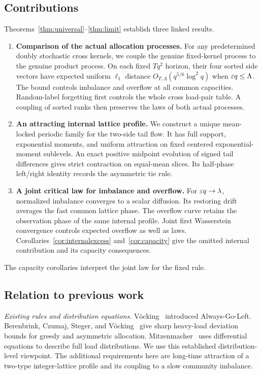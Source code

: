 \subsection{Contributions}
Theorems~\ref{thm:universal}--\ref{thm:limit} establish three linked results.
\begin{enumerate}[label=(\roman*),leftmargin=*]
\item \textbf{Comparison of the actual allocation processes.}
For any predetermined doubly stochastic cross kernels, we couple the genuine
fixed-kernel process to the genuine product process. On each fixed $Tq^2$
horizon, their four sorted side vectors have expected uniform $\ell_1$
distance $O_{T,\Lambda}(q^{5/6}\log^2q)$ when $\varepsilon q\le\Lambda$.
The bound controls imbalance and overflow at all common capacities.
Random-label forgetting first controls the whole cross load-pair table.
A coupling of sorted ranks then preserves the laws of both actual processes.
\item \textbf{An attracting internal lattice profile.}
We construct a unique mean-locked periodic family for the two-side tail flow.
It has full support, exponential moments, and uniform attraction on fixed
centered exponential-moment sublevels. An exact positive midpoint evolution
of signed tail differences gives strict contraction on equal-mean slices.
Its half-phase left/right identity records the asymmetric tie rule.
\item \textbf{A joint critical law for imbalance and overflow.}
For $\varepsilon q\to\lambda$, normalized imbalance converges to a scalar diffusion.
Its restoring drift averages the fast common lattice phase.
The overflow curve retains the observation phase of the same internal profile.
Joint first Wasserstein convergence controls expected overflow as well as laws.
Corollaries~\ref{cor:internalexcess} and~\ref{cor:capacity} give the omitted
internal contribution and its capacity consequences.
\end{enumerate}
The capacity corollaries interpret the joint law for the fixed rule.

\subsection{Relation to previous work}
\textit{Existing rules and distribution equations.}
V\"ocking~\cite{vocking} introduced Always-Go-Left.
Berenbrink, Czumaj, Steger, and V\"ocking~\cite{bcsv} give sharp heavy-load
deviation bounds for greedy and asymmetric allocation.
Mitzenmacher~\cite{mitzode} uses differential equations to describe full load
distributions. We use this established distribution-level viewpoint.
The additional requirements here are long-time attraction of a two-type
integer-lattice profile and its coupling to a slow community imbalance.

